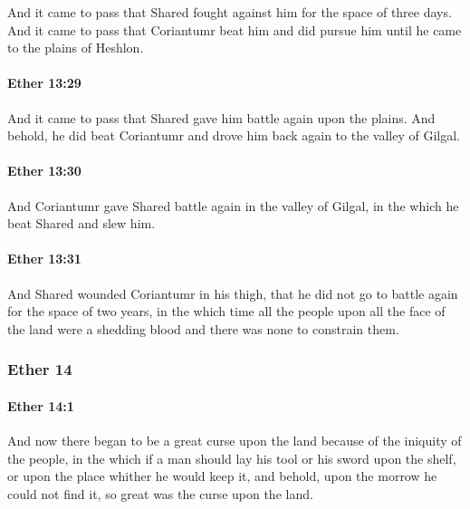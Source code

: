 			And it came to pass that Shared fought against him for the space of three days.
			And it came to pass that Coriantumr beat him and did pursue him
			until he came to the plains of Heshlon.

		\paragraph{Ether 13:29} %
			\label{ETHER-13-29}

			And it came to pass that Shared gave him battle again upon the plains.
			And behold, he did beat Coriantumr
			and drove him back again to the valley of Gilgal.

		\paragraph{Ether 13:30} %
			\label{ETHER-13-30}

			And Coriantumr gave Shared battle again in the valley of Gilgal,
			in the which he beat Shared and slew him.

		\paragraph{Ether 13:31} %
			\label{ETHER-13-31}

			And Shared wounded Coriantumr in his thigh,
			that he did not go to battle again for the space of two years,
			in the which time all the people upon all the face of the land
			were a shedding blood
			and there was none to constrain them.

	\subsubsection{Ether 14} %
		\label{ETHER-14}
		
		\paragraph{Ether 14:1} %
			\label{ETHER-14-1}

			And now there began to be a great curse upon the land
			because of the iniquity of the people,
			in the which if a man should lay his tool or his sword upon the shelf,
			or upon the place whither he would keep it,
			and behold, upon the morrow he could not find it,
			so great was the curse upon the land.

